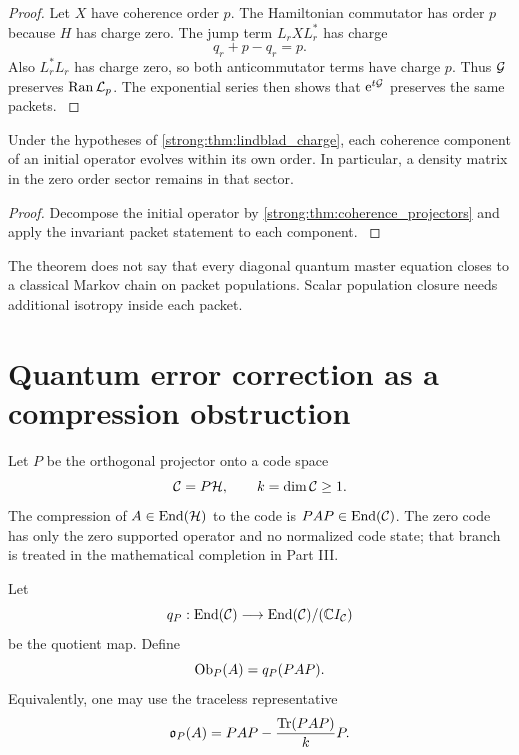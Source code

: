 \begin{proof}\label{strong:proof:037}
Let \(X\) have coherence order \(p\). The Hamiltonian commutator has order \(p\) because \(H\) has charge zero. The jump term \(L_rXL_r^*\) has charge
\[
q_r+p-q_r=p.
\]
Also \(L_r^*L_r\) has charge zero, so both anticommutator terms have charge \(p\). Thus \(\Gcal\) preserves \(\Ran\Lcal_p\). The exponential series then shows that \(\e^{t\Gcal}\) preserves the same packets.
\label{strong:proof:037:end}\end{proof}

\begin{corollary}\label{strong:corollary:010}\label{strong:cor:no_coherence_mixing}
Under the hypotheses of \cref{strong:thm:lindblad_charge}, each coherence component of an initial operator evolves within its own order. In particular, a density matrix in the zero order sector remains in that sector.
\end{corollary}

\begin{proof}\label{strong:proof:038}
Decompose the initial operator by \cref{strong:thm:coherence_projectors} and apply the invariant packet statement to each component.
\label{strong:proof:038:end}\end{proof}

The theorem does not say that every diagonal quantum master equation closes to a classical Markov chain on packet populations. Scalar population closure needs additional isotropy inside each packet.

\section{Quantum error correction as a compression obstruction}\label{strong:section:008}\label{strong:sec:qec}

Let \(P\) be the orthogonal projector onto a code space
\[
\Ccal=P\Hcal,
\qquad
k=\dim\Ccal\ge1.
\]
The compression of \(A\in\End(\Hcal)\) to the code is \(PAP\in\End(\Ccal)\). The zero code has only the zero supported operator and no normalized code state; that branch is treated in the mathematical completion in Part III.

\begin{definition}\label{strong:definition:005}\label{strong:def:code_obstruction}
Let
\[
q_P:\End(\Ccal)\longrightarrow\End(\Ccal)/(\CC I_{\Ccal})
\]
be the quotient map. Define
\[
\operatorname{Ob}_P(A)=q_P(PAP).
\]
Equivalently, one may use the traceless representative
\[
\ob_P(A)
=
PAP-
\frac{\Tr(PAP)}{k}P.
\]
\end{definition}

